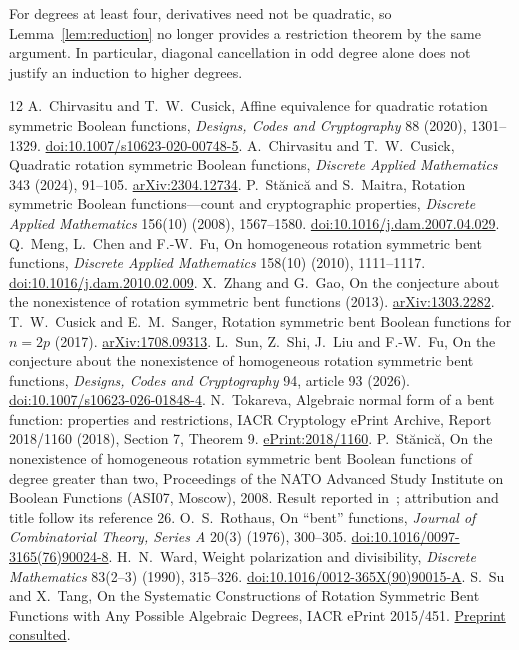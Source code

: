 \documentclass[11pt,a4paper]{article}
\begin{document}
For degrees at least four, derivatives need not be quadratic, so Lemma~\ref{lem:reduction} no longer provides a restriction theorem by the same argument. In particular, diagonal cancellation in odd degree alone does not justify an induction to higher degrees.

\begin{thebibliography}{12}
 A.~Chirvasitu and T.~W.~Cusick, Affine equivalence for quadratic rotation symmetric Boolean functions, \emph{Designs, Codes and Cryptography} 88 (2020), 1301--1329. \href{https://doi.org/10.1007/s10623-020-00748-5}{doi:10.1007/s10623-020-00748-5}.
 A.~Chirvasitu and T.~W.~Cusick, Quadratic rotation symmetric Boolean functions, \emph{Discrete Applied Mathematics} 343 (2024), 91--105. \href{https://arxiv.org/abs/2304.12734}{arXiv:2304.12734}.
 P.~St\u{a}nic\u{a} and S.~Maitra, Rotation symmetric Boolean functions---count and cryptographic properties, \emph{Discrete Applied Mathematics} 156(10) (2008), 1567--1580. \href{https://doi.org/10.1016/j.dam.2007.04.029}{doi:10.1016/j.dam.2007.04.029}.
 Q.~Meng, L.~Chen and F.-W.~Fu, On homogeneous rotation symmetric bent functions, \emph{Discrete Applied Mathematics} 158(10) (2010), 1111--1117. \href{https://doi.org/10.1016/j.dam.2010.02.009}{doi:10.1016/j.dam.2010.02.009}.
 X.~Zhang and G.~Gao, On the conjecture about the nonexistence of rotation symmetric bent functions (2013). \href{https://arxiv.org/abs/1303.2282}{arXiv:1303.2282}.
 T.~W.~Cusick and E.~M.~Sanger, Rotation symmetric bent Boolean functions for $n=2p$ (2017). \href{https://arxiv.org/abs/1708.09313}{arXiv:1708.09313}.
 L.~Sun, Z.~Shi, J.~Liu and F.-W.~Fu, On the conjecture about the nonexistence of homogeneous rotation symmetric bent functions, \emph{Designs, Codes and Cryptography} 94, article 93 (2026). \href{https://doi.org/10.1007/s10623-026-01848-4}{doi:10.1007/s10623-026-01848-4}.
 N.~Tokareva, Algebraic normal form of a bent function: properties and restrictions, IACR Cryptology ePrint Archive, Report 2018/1160 (2018), Section 7, Theorem 9. \href{https://eprint.iacr.org/2018/1160}{ePrint:2018/1160}.
 P.~St\u{a}nic\u{a}, On the nonexistence of homogeneous rotation symmetric bent Boolean functions of degree greater than two, Proceedings of the NATO Advanced Study Institute on Boolean Functions (ASI07, Moscow), 2008. Result reported in~\cite{tokareva}; attribution and title follow its reference 26.
 O.~S.~Rothaus, On ``bent'' functions, \emph{Journal of Combinatorial Theory, Series A} 20(3) (1976), 300--305. \href{https://doi.org/10.1016/0097-3165(76)90024-8}{doi:10.1016/0097-3165(76)90024-8}.
 H.~N.~Ward, Weight polarization and divisibility, \emph{Discrete Mathematics} 83(2--3) (1990), 315--326. \href{https://doi.org/10.1016/0012-365X(90)90015-A}{doi:10.1016/0012-365X(90)90015-A}.
 S.~Su and X.~Tang, On the Systematic Constructions of Rotation Symmetric Bent Functions with Any Possible Algebraic Degrees, IACR ePrint 2015/451. \href{https://eprint.iacr.org/2015/451.pdf}{Preprint consulted}.
\end{thebibliography}
\end{document}
